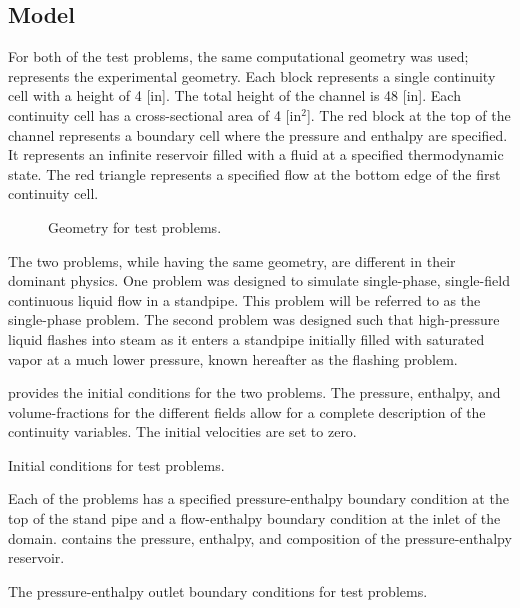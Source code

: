 \subsection{Model}
\label{subsect:single_model}
For both of the test problems, the same computational geometry was used;   represents the experimental geometry.
Each block represents a single continuity cell with a height of 4 [in].
The total height of the channel is 48 [in].
Each continuity cell has a cross-sectional area of 4 [in$^2$].
The red block at the top of the channel represents a boundary cell where the pressure and enthalpy are specified.
It represents an infinite reservoir filled with a fluid at a specified thermodynamic state.
The red triangle represents a specified flow at the bottom edge of the first continuity cell. 

\begin{figure}[h!t]
\centering

\caption{Geometry for test problems.}
\label{fig:exp_geometry}
\end{figure}

The two problems, while having the same geometry, are different in their dominant physics.
One problem was designed to simulate single-phase, single-field continuous liquid flow in a standpipe.
This problem will be referred to as the single-phase problem.
The second problem was designed such that high-pressure liquid flashes into steam as it enters a standpipe initially filled with saturated vapor at a much lower pressure, known hereafter as the flashing problem.

 provides the initial conditions for the two problems.
The pressure, enthalpy, and volume-fractions for the different fields allow for a complete description of the continuity variables.
The initial velocities are set to zero.

\begin{table}[ht]
\centering
\singlespace

\caption{Initial conditions for test problems.}
\label{tab:ic}
\end{table}

Each of the problems has a specified pressure-enthalpy boundary condition at the top of the stand pipe and a flow-enthalpy boundary condition at the inlet of the domain.
 contains the pressure, enthalpy, and composition of the pressure-enthalpy reservoir. 

\begin{table}[h!t]
\centering
\singlespace

\caption{The pressure-enthalpy outlet boundary conditions for test problems.}
\label{tab:bc_pe}
\end{table}

